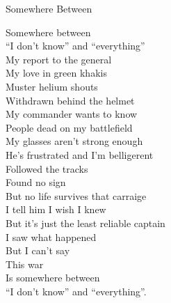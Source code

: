 Somewhere Between

Somewhere between\\
``I don't know'' and ``everything''\\
My report to the general\\
My love in green khakis\\
Muster helium shouts\\
Withdrawn behind the helmet\\
My commander wants to know\\
People dead on my battlefield\\
My glasses aren't strong enough\\
He's frustrated and I'm belligerent\\
Followed the tracks\\
Found no sign\\
But no life survives that carraige\\
I tell him I wish I knew\\
But it's just the least reliable captain\\
I saw what happened\\
But I can't say\\
This war\\
Is somewhere between\\
``I don't know'' and ``everything''.\\

